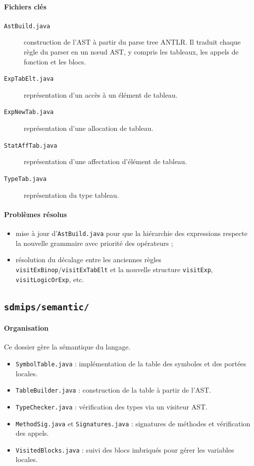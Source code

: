 \documentclass[a4paper,11pt]{article}
\begin{document}
\paragraph{Fichiers clés}
\begin{description}
  \item[\texttt{AstBuild.java}] construction de l'AST à partir du parse tree ANTLR. Il traduit chaque règle du parser en un nœud AST, y compris les tableaux, les appels de fonction et les blocs.
  \item[\texttt{ExpTabElt.java}] représentation d'un accès à un élément de tableau.
  \item[\texttt{ExpNewTab.java}] représentation d'une allocation de tableau.
  \item[\texttt{StatAffTab.java}] représentation d'une affectation d'élément de tableau.
  \item[\texttt{TypeTab.java}] représentation du type tableau.
\end{description}

\paragraph{Problèmes résolus}
\begin{itemize}
  \item mise à jour d'\texttt{AstBuild.java} pour que la hiérarchie des expressions respecte la nouvelle grammaire avec priorité des opérateurs ;
  \item résolution du décalage entre les anciennes règles \texttt{visitExBinop}/\texttt{visitExTabElt} et la nouvelle structure \texttt{visitExp}, \texttt{visitLogicOrExp}, etc.
\end{itemize}

\subsection{\texttt{sdmips/semantic/}}
\paragraph{Organisation}
Ce dossier gère la sémantique du langage.
\begin{itemize}
  \item \texttt{SymbolTable.java} : implémentation de la table des symboles et des portées locales.
  \item \texttt{TableBuilder.java} : construction de la table à partir de l'AST.
  \item \texttt{TypeChecker.java} : vérification des types via un visiteur AST.
  \item \texttt{MethodSig.java} et \texttt{Signatures.java} : signatures de méthodes et vérification des appels.
  \item \texttt{VisitedBlocks.java} : suivi des blocs imbriqués pour gérer les variables locales.
\end{itemize}
\end{document}
